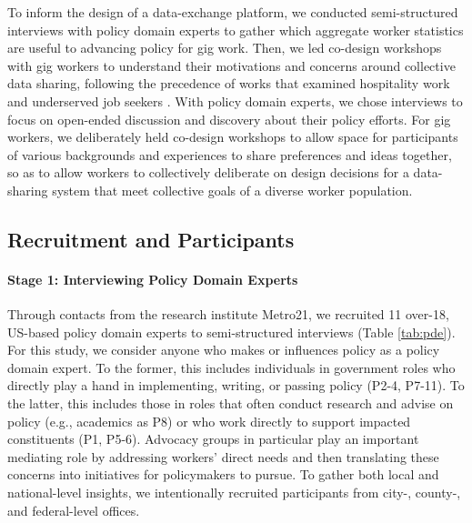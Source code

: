 To inform the design of a data-exchange platform, we conducted semi-structured interviews with policy domain experts to gather which aggregate worker statistics are useful to advancing policy for gig work. Then, we led co-design workshops with gig workers to understand their motivations and concerns around collective data sharing, {following the precedence of works that examined hospitality work and underserved job seekers \cite{dillahunt2018designing, spektor2023designing}.} {With policy domain experts, we chose interviews to focus on open-ended discussion and discovery about their policy efforts. 
For gig workers, we deliberately held co-design workshops to allow space for participants of various backgrounds and experiences to share preferences and ideas together, so as to allow workers to collectively deliberate on design decisions for a data-sharing system that meet collective goals of a diverse worker population.}

\subsection{Recruitment and Participants}
\label{h.kvn6j5yejjmz}

\paragraph{Stage 1: Interviewing Policy Domain Experts}\label{h.pu0gzew4e1gn}
{Through contacts from the research institute Metro21, w}e recruited 11 over-18, US-based policy domain experts to semi-structured interviews (Table \ref{tab:pde}). For this study, we consider anyone who makes or influences policy as a policy domain expert. 
%
{To the former, this includes individuals in government roles who directly play a hand in implementing, writing, or passing policy (P2-4, P7-11). To the latter, this includes those in roles that often conduct research and advise on policy (e.g., academics as P8) or who work directly to support impacted constituents (P1, P5-6). Advocacy groups in particular play an important mediating role by addressing workers' direct needs and then translating these concerns into initiatives for policymakers to pursue.}
%
{To gather both local and national-level insights, we intentionally recruited participants from city-, county-, and federal-level offices.}



